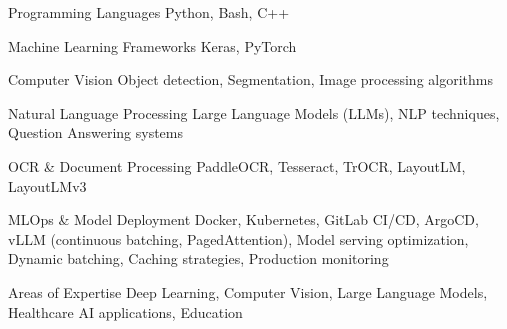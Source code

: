 
\begin{cvskills}

  \cvskill
    {Programming Languages}
    {Python, Bash, C++}

  \cvskill
    {Machine Learning Frameworks}
    {Keras, PyTorch}

  \cvskill
    {Computer Vision}
    {Object detection, Segmentation, Image processing algorithms}

  \cvskill
    {Natural Language Processing}
    {Large Language Models (LLMs), NLP techniques, Question Answering systems}

  \cvskill
    {OCR \& Document Processing}
    {PaddleOCR, Tesseract, TrOCR, LayoutLM, LayoutLMv3}

  \cvskill
    {MLOps \& Model Deployment}
    {Docker, Kubernetes, GitLab CI/CD, ArgoCD, vLLM (continuous batching, PagedAttention), Model serving optimization, Dynamic batching, Caching strategies, Production monitoring}

  \cvskill
    {Areas of Expertise}
    {Deep Learning, Computer Vision, Large Language Models, Healthcare AI applications, Education}

\end{cvskills}

